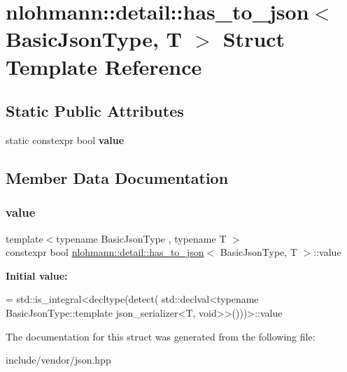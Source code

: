\hypertarget{structnlohmann_1_1detail_1_1has__to__json}{}\section{nlohmann\+:\+:detail\+:\+:has\+\_\+to\+\_\+json$<$ Basic\+Json\+Type, T $>$ Struct Template Reference}
\label{structnlohmann_1_1detail_1_1has__to__json}
\subsection*{Static Public Attributes}
\begin{DoxyCompactItemize}
\item 
static constexpr bool {\bfseries value}
\end{DoxyCompactItemize}


\subsection{Member Data Documentation}
\mbox{\label{structnlohmann_1_1detail_1_1has__to__json_a18e260c3c6f10328637c4427d3cb3a31}} 
\subsubsection{\texorpdfstring{value}{value}}
{\footnotesize\ttfamily template$<$typename Basic\+Json\+Type , typename T $>$ \\
constexpr bool \mbox{\hyperlink{structnlohmann_1_1detail_1_1has__to__json}{nlohmann\+::detail\+::has\+\_\+to\+\_\+json}}$<$ Basic\+Json\+Type, T $>$\+::value\hspace{0.3cm}{\ttfamily [static]}}

{\bfseries Initial value\+:}
\begin{DoxyCode}
= std::is\_integral<decltype(detect(
                                      std::declval<\textcolor{keyword}{typename} BasicJsonType::template json\_serializer<T,
       void>>()))>::value
\end{DoxyCode}


The documentation for this struct was generated from the following file\+:\begin{DoxyCompactItemize}
\item 
include/vendor/json.\+hpp\end{DoxyCompactItemize}
